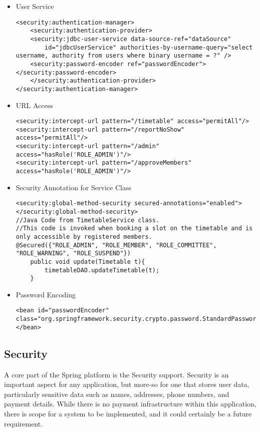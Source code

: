 \begin{itemize}
\item User Service
\begin{lstlisting}
<security:authentication-manager>	
	<security:authentication-provider>
	<security:jdbc-user-service data-source-ref="dataSource"
		id="jdbcUserService" authorities-by-username-query="select username, authority from users where binary username = ?" />
	<security:password-encoder ref="passwordEncoder"></security:password-encoder>
	</security:authentication-provider>
</security:authentication-manager>
\end{lstlisting}
\item URL Access
\begin{lstlisting}
<security:intercept-url pattern="/timetable" access="permitAll"/>
<security:intercept-url pattern="/reportNoShow" access="permitAll"/>
<security:intercept-url pattern="/admin" access="hasRole('ROLE_ADMIN')"/>
<security:intercept-url pattern="/approveMembers" access="hasRole('ROLE_ADMIN')"/>
\end{lstlisting}
\item Security Annotation for Service Class
\begin{lstlisting}
<security:global-method-security secured-annotations="enabled"></security:global-method-security>
//Java Code from TimetableService class. 
//This code is invoked when booking a slot on the timetable and is only accessible by registered members.
@Secured({"ROLE_ADMIN", "ROLE_MEMBER", "ROLE_COMMITTEE", "ROLE_WARNING", "ROLE_SUSPEND"})
	public void update(Timetable t){
		timetableDAO.updateTimetable(t);
	}
\end{lstlisting}
\item Password Encoding
\begin{lstlisting}
<bean id="passwordEncoder"
class="org.springframework.security.crypto.password.StandardPasswordEncoder">
</bean>
\end{lstlisting}
\end{itemize}

\subsection{Security}

A core part of the Spring platform is the Security support. Security is an important aspect for any application, but more-so for one that stores user data, particularly sensitive data such as names, addresses, phone numbers, and payment details. While there is no payment infrastructure within this application, there is scope for a system to be implemented, and it could certainly be a future requirement. 

